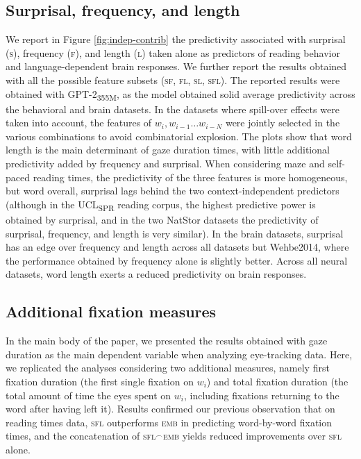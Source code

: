 \documentclass[11pt]{article}
\begin{document}
\subsection{Surprisal, frequency, and length} \label{sec:appendix-sfl}

We report in Figure \ref{fig:indep-contrib} the predictivity associated with surprisal (\textsc{s}), frequency (\textsc{f}), and length (\textsc{l}) taken alone as predictors of reading behavior and language-dependent brain responses. We further report the results obtained with all the possible feature subsets (\textsc{sf}, \textsc{fl}, \textsc{sl}, \textsc{sfl}). The reported results were obtained with GPT-2\textsubscript{355M}, as the model obtained solid average predictivity across the behavioral and brain datasets. In the datasets where spill-over effects were taken into account, the features of $w_i, w_{i-1} \ldots w_{i-N}$ were jointly selected in the various combinations to avoid combinatorial explosion. The plots show that word length is the main determinant of gaze duration times, with little additional predictivity added by frequency and surprisal. When considering maze and self-paced reading times, the predictivity of the three features is more homogeneous, but word overall, surprisal lags behind the two context-independent predictors (although in the UCL\textsubscript{SPR} reading corpus, the highest predictive power is obtained by surprisal, and in the two NatStor datasets the predictivity of surprisal, frequency, and length is very similar). In the brain datasets, surprisal has an edge over frequency and length across all datasets but Wehbe2014, where the performance obtained by frequency alone is slightly better. Across all neural datasets, word length exerts a reduced predictivity on brain responses.

\subsection{Additional fixation measures} \label{sec:appendix-fixmeasures}

In the main body of the paper, we presented the results obtained with gaze duration as the main dependent variable when analyzing eye-tracking data. Here, we replicated the analyses considering two additional measures, namely first fixation duration (the first single fixation on $w_i$) and total fixation duration (the total amount of time the eyes spent on $w_i$, including fixations returning to the word after having left it). Results confirmed our previous observation that on reading times data, \textsc{sfl} outperforms \textsc{emb} in predicting word-by-word fixation times, and the concatenation of \textsc{sfl}$^\frown$\textsc{emb} yields reduced improvements over \textsc{sfl} alone. 
\end{document}
